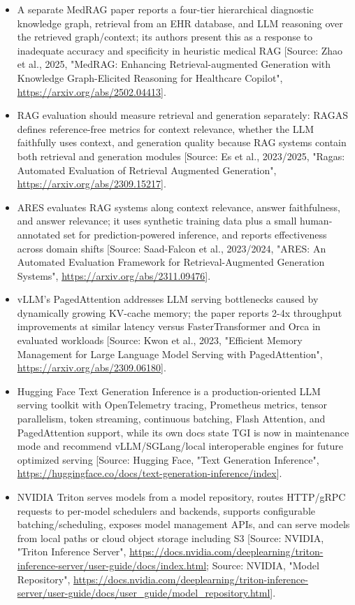 \documentclass[11pt]{report}
\begin{document}
\begin{itemize}
\item A separate MedRAG paper reports a four-tier hierarchical diagnostic knowledge graph, retrieval from an EHR database, and LLM reasoning over the retrieved graph/context; its authors present this as a response to inadequate accuracy and specificity in heuristic medical RAG [Source: Zhao et al., 2025, "MedRAG: Enhancing Retrieval-augmented Generation with Knowledge Graph-Elicited Reasoning for Healthcare Copilot", \url{https://arxiv.org/abs/2502.04413}].
\item RAG evaluation should measure retrieval and generation separately: RAGAS defines reference-free metrics for context relevance, whether the LLM faithfully uses context, and generation quality because RAG systems contain both retrieval and generation modules [Source: Es et al., 2023/2025, "Ragas: Automated Evaluation of Retrieval Augmented Generation", \url{https://arxiv.org/abs/2309.15217}].
\item ARES evaluates RAG systems along context relevance, answer faithfulness, and answer relevance; it uses synthetic training data plus a small human-annotated set for prediction-powered inference, and reports effectiveness across domain shifts [Source: Saad-Falcon et al., 2023/2024, "ARES: An Automated Evaluation Framework for Retrieval-Augmented Generation Systems", \url{https://arxiv.org/abs/2311.09476}].
\item vLLM's PagedAttention addresses LLM serving bottlenecks caused by dynamically growing KV-cache memory; the paper reports 2-4x throughput improvements at similar latency versus FasterTransformer and Orca in evaluated workloads [Source: Kwon et al., 2023, "Efficient Memory Management for Large Language Model Serving with PagedAttention", \url{https://arxiv.org/abs/2309.06180}].
\item Hugging Face Text Generation Inference is a production-oriented LLM serving toolkit with OpenTelemetry tracing, Prometheus metrics, tensor parallelism, token streaming, continuous batching, Flash Attention, and PagedAttention support, while its own docs state TGI is now in maintenance mode and recommend vLLM/SGLang/local interoperable engines for future optimized serving [Source: Hugging Face, "Text Generation Inference", \url{https://huggingface.co/docs/text-generation-inference/index}].
\item NVIDIA Triton serves models from a model repository, routes HTTP/gRPC requests to per-model schedulers and backends, supports configurable batching/scheduling, exposes model management APIs, and can serve models from local paths or cloud object storage including S3 [Source: NVIDIA, "Triton Inference Server", \url{https://docs.nvidia.com/deeplearning/triton-inference-server/user-guide/docs/index.html}; Source: NVIDIA, "Model Repository", \url{https://docs.nvidia.com/deeplearning/triton-inference-server/user-guide/docs/user_guide/model_repository.html}].

\end{itemize}
\end{document}
